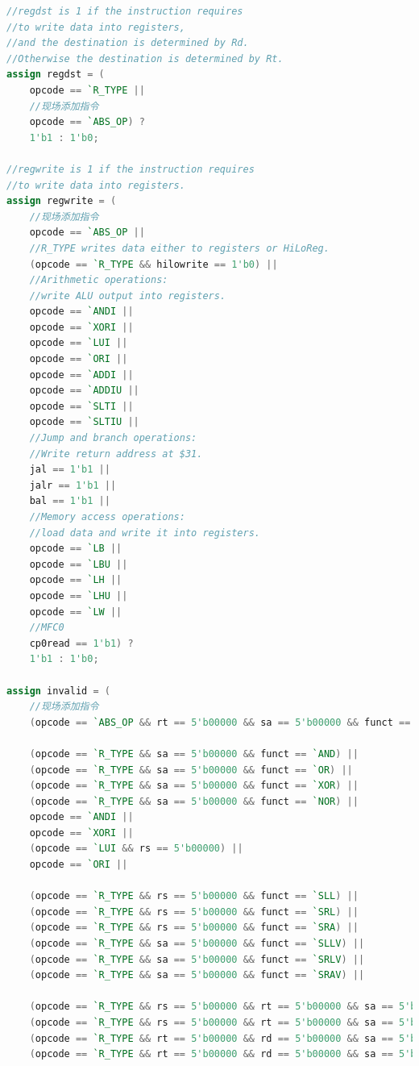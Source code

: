 \begin{lstlisting}[language=Verilog]
//regdst is 1 if the instruction requires 
//to write data into registers, 
//and the destination is determined by Rd.
//Otherwise the destination is determined by Rt.
assign regdst = (
    opcode == `R_TYPE || 
    //现场添加指令
    opcode == `ABS_OP) ? 
    1'b1 : 1'b0;

//regwrite is 1 if the instruction requires 
//to write data into registers.
assign regwrite = (
    //现场添加指令
    opcode == `ABS_OP ||
    //R_TYPE writes data either to registers or HiLoReg.
    (opcode == `R_TYPE && hilowrite == 1'b0) || 
    //Arithmetic operations: 
    //write ALU output into registers.
    opcode == `ANDI || 
    opcode == `XORI || 
    opcode == `LUI ||
    opcode == `ORI || 
    opcode == `ADDI || 
    opcode == `ADDIU || 
    opcode == `SLTI || 
    opcode == `SLTIU || 
    //Jump and branch operations:
    //Write return address at $31.
    jal == 1'b1 || 
    jalr == 1'b1 || 
    bal == 1'b1 ||
    //Memory access operations: 
    //load data and write it into registers.
    opcode == `LB || 
    opcode == `LBU || 
    opcode == `LH || 
    opcode == `LHU || 
    opcode == `LW ||
    //MFC0
    cp0read == 1'b1) ? 
    1'b1 : 1'b0;

assign invalid = (
    //现场添加指令
    (opcode == `ABS_OP && rt == 5'b00000 && sa == 5'b00000 && funct == 6'b00000) ||

    (opcode == `R_TYPE && sa == 5'b00000 && funct == `AND) ||
    (opcode == `R_TYPE && sa == 5'b00000 && funct == `OR) ||
    (opcode == `R_TYPE && sa == 5'b00000 && funct == `XOR) ||
    (opcode == `R_TYPE && sa == 5'b00000 && funct == `NOR) ||
    opcode == `ANDI ||
    opcode == `XORI ||
    (opcode == `LUI && rs == 5'b00000) ||
    opcode == `ORI ||
    
    (opcode == `R_TYPE && rs == 5'b00000 && funct == `SLL) ||
    (opcode == `R_TYPE && rs == 5'b00000 && funct == `SRL) ||
    (opcode == `R_TYPE && rs == 5'b00000 && funct == `SRA) ||
    (opcode == `R_TYPE && sa == 5'b00000 && funct == `SLLV) ||
    (opcode == `R_TYPE && sa == 5'b00000 && funct == `SRLV) ||
    (opcode == `R_TYPE && sa == 5'b00000 && funct == `SRAV) ||
    
    (opcode == `R_TYPE && rs == 5'b00000 && rt == 5'b00000 && sa == 5'b00000 && funct == `MFHI) ||
    (opcode == `R_TYPE && rs == 5'b00000 && rt == 5'b00000 && sa == 5'b00000 && funct == `MFLO) ||
    (opcode == `R_TYPE && rt == 5'b00000 && rd == 5'b00000 && sa == 5'b00000 && funct == `MTHI) ||
    (opcode == `R_TYPE && rt == 5'b00000 && rd == 5'b00000 && sa == 5'b00000 && funct == `MTLO) ||
    

\end{lstlisting}
